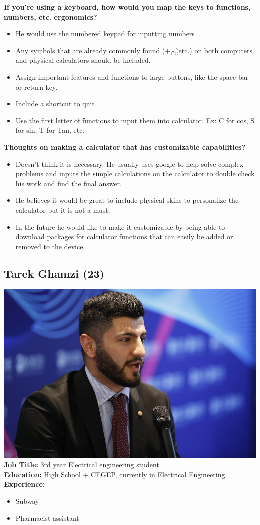 \documentclass{article}
\begin{document}
\textbf{If you’re using a keyboard, how would you map the keys to functions, numbers, etc. ergonomics?}
\begin{itemize}
\itemsep0em 
\item He would use the numbered keypad for inputting numbers 
\item Any symbols that are already commonly found (+,-,\^,etc.) on both computers and physical calculators should be included.
\item Assign important features and functions to large buttons, like the space bar or return key.
\item Include a shortcut to quit
\item Use the first letter of functions to input them into calculator. Ex: C for cos, S for sin, T for Tan, etc.
\end{itemize}

\textbf{Thoughts on making a calculator that has customizable capabilities? }
\begin{itemize}
\itemsep0em 
\item Doesn’t think it is necessary. He usually uses google to help solve complex problems and inputs the simple calculations on the calculator to double check his work and find the final answer. 
\item He believes it would be great to include physical skins to personalize the calculator but it is not a must.
\item In the future he would like to make it customizable by being able to download packages for calculator functions that can easily be added or removed to the device.
\end{itemize}
\pagebreak

\subsection*{Tarek Ghamzi (23)}
\includegraphics[scale=0.25]{tarek.jpg}\\
\textbf{Job Title: }3rd year Electrical engineering student\\
\textbf{Education:} High School + CEGEP, currently in Electrical Engineering\\
\textbf{Experience:}
\begin{itemize}
\itemsep0em 
\item Subway
\item Pharmacist assistant
\end{itemize}
\end{document}
